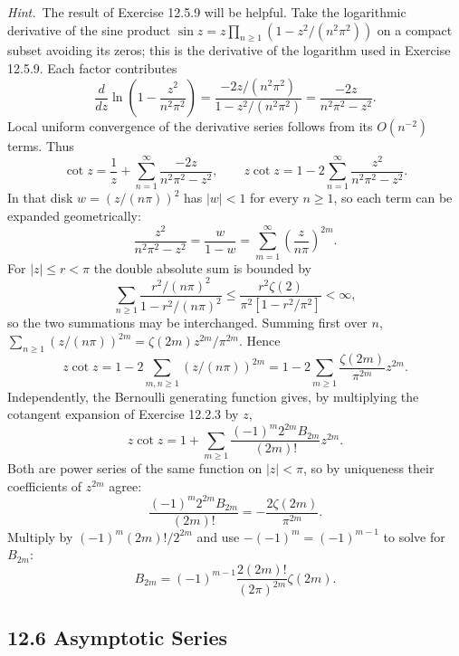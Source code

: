 \emph{Hint.}~The result of Exercise 12.5.9 will be helpful.
\solution
Take the logarithmic derivative of the sine product
$\sin z=z\prod_{n\ge1}(1-z^2/(n^2\pi^2))$ on a compact subset
avoiding its zeros; this is the derivative of the logarithm used in
Exercise 12.5.9. Each factor contributes
\[
\frac{d}{dz}\ln\left(1-\frac{z^2}{n^2\pi^2}\right)
=\frac{-2z/(n^2\pi^2)}{1-z^2/(n^2\pi^2)}
=\frac{-2z}{n^2\pi^2-z^2}.
\]
Local uniform convergence of the derivative series
follows from its $O(n^{-2})$ terms. Thus
\[
\cot z=\frac1z+\sum_{n=1}^{\infty}
 \frac{-2z}{n^2\pi^2-z^2},\qquad
z\cot z=1-2\sum_{n=1}^{\infty}\frac{z^2}{n^2\pi^2-z^2}.
\]
In that disk $w=(z/(n\pi))^2$ has $|w|<1$ for every $n\ge1$, so each
term can be expanded geometrically:
\[
\frac{z^2}{n^2\pi^2-z^2}=\frac{w}{1-w}
=\sum_{m=1}^{\infty}\left(\frac{z}{n\pi}\right)^{2m}.
\]
For $|z|\le r<\pi$ the double absolute sum is bounded by
\[
\sum_{n\ge1}\frac{r^2/(n\pi)^2}{1-r^2/(n\pi)^2}
\le\frac{r^2\zeta(2)}{\pi^2[1-r^2/\pi^2]}<\infty,
\]
so the two summations may be interchanged. Summing first over $n$,
$\sum_{n\ge1}(z/(n\pi))^{2m}=\zeta(2m)z^{2m}/\pi^{2m}$. Hence
\[
\boxed{z\cot z=1-2\sum_{m,n\ge1}(z/(n\pi))^{2m}}
=1-2\sum_{m\ge1}\frac{\zeta(2m)}{\pi^{2m}}z^{2m}.
\]
Independently, the Bernoulli generating function gives, by multiplying
the cotangent expansion of Exercise 12.2.3 by $z$,
\[
z\cot z=1+\sum_{m\ge1}
 \frac{(-1)^m2^{2m}B_{2m}}{(2m)!}z^{2m}.
\]
Both are power series of the same function on $|z|<\pi$, so by uniqueness
their coefficients of $z^{2m}$ agree:
\[
\frac{(-1)^m2^{2m}B_{2m}}{(2m)!}=-\frac{2\zeta(2m)}{\pi^{2m}}.
\]
Multiply by $(-1)^m(2m)!/2^{2m}$ and use $-(-1)^m=(-1)^{m-1}$ to solve
for $B_{2m}$:
\[
\boxed{B_{2m}=(-1)^{m-1}\frac{2(2m)!}{(2\pi)^{2m}}\zeta(2m)}.
\]

\subsection*{12.6 Asymptotic Series}

